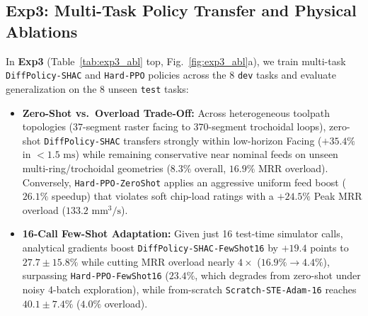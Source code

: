 \documentclass[conference]{IEEEtran}
\begin{document}
\subsection{Exp3: Multi-Task Policy Transfer and Physical Ablations}
In \textbf{Exp3} (Table~\ref{tab:exp3_abl} top, Fig.~\ref{fig:exp3_abl}a), we train multi-task \texttt{DiffPolicy-SHAC} and \texttt{Hard-PPO} policies across the 8 \texttt{dev} tasks and evaluate generalization on the 8 unseen \texttt{test} tasks:
\begin{itemize}
  \item \textbf{Zero-Shot vs.\ Overload Trade-Off:} Across heterogeneous toolpath topologies ($37$-segment raster facing to $370$-segment trochoidal loops), zero-shot \texttt{DiffPolicy-SHAC} transfers strongly within low-horizon Facing ($\mathbf{+35.4\%}$ in $<\!1.5\text{ ms}$) while remaining conservative near nominal feeds on unseen multi-ring/trochoidal geometries ($8.3\%$ overall, $16.9\%$ MRR overload). Conversely, \texttt{Hard-PPO-ZeroShot} applies an aggressive uniform feed boost ($26.1\%$ speedup) that violates soft chip-load ratings with a $\mathbf{+24.5\%}$ Peak MRR overload ($133.2\text{ mm}^3/\text{s}$).
  \item \textbf{16-Call Few-Shot Adaptation:} Given just 16 test-time simulator calls, analytical gradients boost \texttt{DiffPolicy-SHAC-FewShot16} by $+19.4$ points to $\mathbf{27.7 \pm 15.8\%}$ while cutting MRR overload nearly $4\times$ ($16.9\% \to \mathbf{4.4\%}$), surpassing \texttt{Hard-PPO-FewShot16} ($23.4\%$, which degrades from zero-shot under noisy 4-batch exploration), while from-scratch \texttt{Scratch-STE-Adam-16} reaches $\mathbf{40.1 \pm 7.4\%}$ ($4.0\%$ overload).
\end{itemize}
\end{document}
